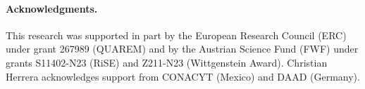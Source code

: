 \vspace*{-10px}
\paragraph{Acknowledgments.} This research was supported in part by the European Research Council
(ERC) under grant 267989 (QUAREM) and by the Austrian Science Fund
(FWF) under grants S11402-N23 (RiSE) and Z211-N23 (Wittgenstein
Award). Christian Herrera acknowledges support from CONACYT (Mexico)
and DAAD (Germany).







